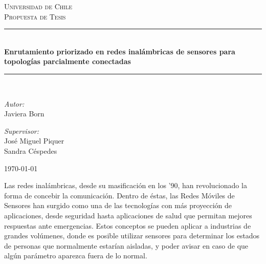 \documentclass[10pt,preprint,onecolumn]{paper}
\newcommand{\HRule}{\rule{\linewidth}{0.5mm}}
\begin{document}
\begin{titlepage}
\begin{center}


\textsc{\LARGE Universidad de Chile}\\[1.5cm]

\textsc{\Large Propuesta de Tesis}\\[0.5cm]

\HRule \\[0.4cm]
{ \huge \bfseries Enrutamiento priorizado en redes inalámbricas de sensores para topologías parcialmente conectadas \\[0.4cm] }

\HRule \\[1.5cm]

\begin{minipage}{0.4\textwidth}
\begin{flushleft} \large
\vspace{3cm}
\emph{Autor:}\\
Javiera Born
\end{flushleft}
\end{minipage}
\begin{minipage}{0.4\textwidth}
\begin{flushright} \large
\vspace{3cm}
\emph{Supervisor:} \\
José Miguel Piquer \\
Sandra Céspedes
\end{flushright}
\end{minipage}

\vfill

{\large \today}

\end{center}
\end{titlepage}


\begin{abstract}


\end{abstract}

Las redes inalámbricas, desde su masificación en los '90, han revolucionado la forma de concebir la comunicación. Dentro de éstas, las Redes Móviles de Sensores han surgido como una de las tecnologías con más proyección de aplicaciones, desde seguridad hasta aplicaciones de salud que permitan mejores respuestas ante emergencias. Estos conceptos se pueden aplicar a industrias de grandes volúmenes, donde es posible utilizar sensores para determinar los estados de personas que normalmente estarían aisladas, y poder avisar en caso de que algún parámetro aparezca fuera de lo normal. 
\end{document}
